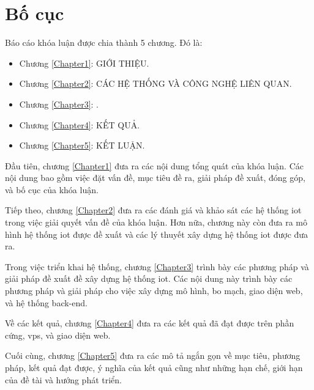 \section{Bố cục}

Báo cáo khóa luận được chia thành 5 chương. Đó là:
\begin{itemize}
    \item Chương \ref{Chapter1}: GIỚI THIỆU.
    \item Chương \ref{Chapter2}: CÁC HỆ THỐNG VÀ CÔNG NGHỆ LIÊN QUAN.
    \item Chương \ref{Chapter3}: \textsc{\tenKL}.
    \item Chương \ref{Chapter4}: KẾT QUẢ.
    \item Chương \ref{Chapter5}: KẾT LUẬN.
\end{itemize}

Đầu tiên, chương \ref{Chapter1} đưa ra các nội dung tổng quát của khóa luận. Các nội dung bao gồm việc đặt vấn đề, mục tiêu đề ra, giải pháp đề xuất, đóng góp, và bố cục của khóa luận.

Tiếp theo, chương \ref{Chapter2} đưa ra các đánh giá và khảo sát các hệ thống \acrshort{iot} trong việc giải quyết vấn đề của khóa luận. Hơn nữa, chương này còn đưa ra mô hình hệ thống \acrshort{iot} được đề xuất và các lý thuyết xây dựng hệ thống \acrshort{iot} được đưa ra.

Trong việc triển khai hệ thống, chương \ref{Chapter3} trình bày các phương pháp và giải pháp đề xuất đề xây dựng hệ thống \acrshort{iot}. Các nội dung này trình bày các phương pháp và giải pháp cho việc xây dựng mô hình, bo mạch, giao diện web, và hệ thống back-end.

Về các kết quả, chương \ref{Chapter4} đưa ra các kết quả đã đạt được trên phần cứng, \acrshort{vps}, và giao diện web.

Cuối cùng, chương \ref{Chapter5} đưa ra các mô tả ngắn gọn về mục tiêu, phương pháp, kết quả đạt được, ý nghĩa của kết quả cũng như những hạn chế, giới hạn của đề tài và hướng phát triển.


